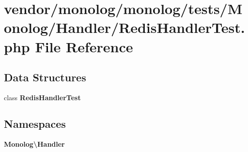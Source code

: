 \section{vendor/monolog/monolog/tests/\+Monolog/\+Handler/\+Redis\+Handler\+Test.php File Reference}
\label{_redis_handler_test_8php}
\subsection*{Data Structures}
\begin{DoxyCompactItemize}
\item 
class {\bf Redis\+Handler\+Test}
\end{DoxyCompactItemize}
\subsection*{Namespaces}
\begin{DoxyCompactItemize}
\item 
 {\bf Monolog\textbackslash{}\+Handler}
\end{DoxyCompactItemize}
